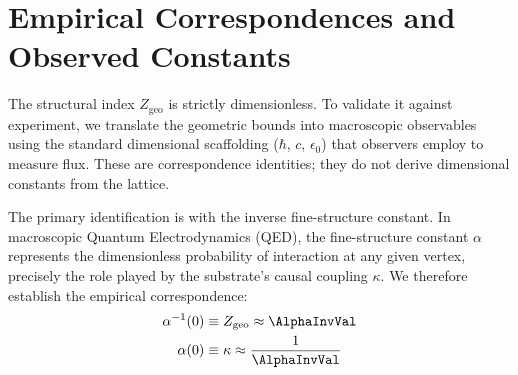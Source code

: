 




\section{Empirical Correspondences and Observed Constants}
\label{sec:empirical_correspondences}

The structural index $Z_{\text{geo}}$ is strictly dimensionless. To validate it against experiment, we translate the geometric bounds into macroscopic observables using the standard dimensional scaffolding ($\hbar$, $c$, $\epsilon_0$) that observers employ to measure flux. These are correspondence identities; they do not derive dimensional constants from the lattice.

The primary identification is with the inverse fine-structure constant. In macroscopic Quantum Electrodynamics (QED), the fine-structure constant $\alpha$ represents the dimensionless probability of interaction at any given vertex, precisely the role played by the substrate's causal coupling $\kappa$. We therefore establish the empirical correspondence:
\begin{equation}
\begin{split}    
    \alpha^{-1}(0) &\equiv Z_{\text{geo}} \approx \AlphaInvVal \\
    \alpha(0) &\equiv \kappa \approx \frac{1}{\AlphaInvVal}
\end{split}
\end{equation}

